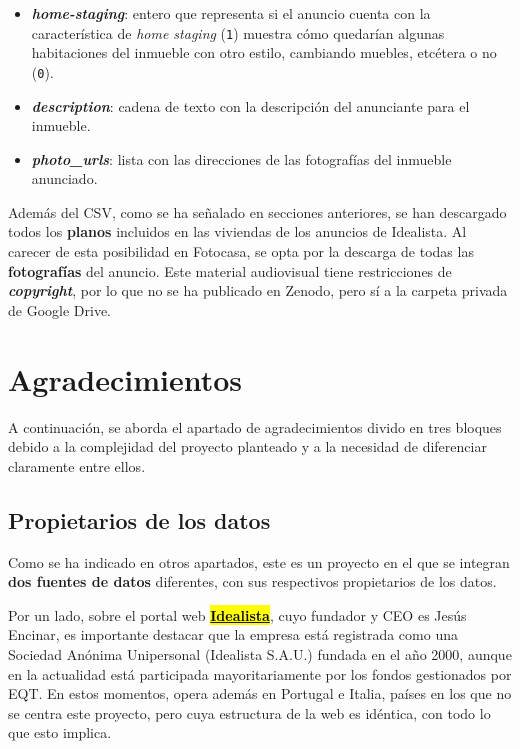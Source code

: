 \documentclass[12pt]{article}
\begin{document}
\begin{itemize}[topsep=0cm,partopsep=0cm]
	\item \textbf{\textit{home-staging}}: entero que representa si el anuncio cuenta con la característica de \textit{home staging} (\verb|1|) \textemdash muestra cómo quedarían algunas habitaciones del inmueble con otro estilo, cambiando muebles, etcétera \textemdash  o no (\verb|0|).
	\item \textbf{\textit{description}}: cadena de texto con la descripción del anunciante para el inmueble.
	\item \textbf{\textit{photo\_urls}}: lista con las direcciones de las fotografías del inmueble anunciado.
\end{itemize}

Además del CSV, como se ha señalado en secciones anteriores, se han descargado todos los \textbf{planos} incluidos en las viviendas de los anuncios de Idealista. Al carecer de esta posibilidad en Fotocasa, se opta por la descarga de todas las \textbf{fotografías} del anuncio. Este material audiovisual tiene restricciones de \textbf{\textit{copyright}}, por lo que no se ha publicado en Zenodo, pero sí a la carpeta privada de Google Drive. 

\vspace{-1.5em}\section{Agradecimientos}\vspace{-1.0em}

A continuación, se aborda el apartado de agradecimientos divido en tres bloques debido a la complejidad del proyecto planteado y a la necesidad de diferenciar claramente entre ellos. 

\vspace{-1.5em}\subsection*{Propietarios de los datos}\vspace{-1.0em}

Como se ha indicado en otros apartados, este es un proyecto en el que se integran \textbf{dos fuentes de datos} diferentes, con sus respectivos propietarios de los datos. 

Por un lado, sobre el portal web \href{http://www.idealista.com}{\textbf{\hl{Idealista}}}, cuyo fundador y CEO es Jesús Encinar, es importante destacar que la empresa está registrada como una Sociedad Anónima Unipersonal (Idealista S.A.U.) fundada en el año 2000, aunque en la actualidad está participada mayoritariamente por los fondos gestionados por EQT. En estos momentos, opera además en Portugal e Italia, países en los que no se centra este proyecto, pero cuya estructura de la web es idéntica, con todo lo que esto implica. 
\end{document}
